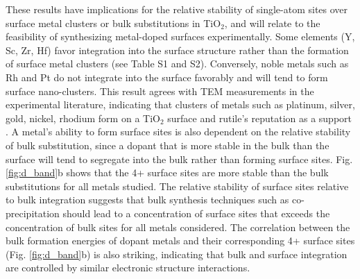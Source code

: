 
These results have implications for the relative stability of single-atom sites over surface metal clusters or bulk substitutions in TiO$_2$, and will relate to the feasibility of synthesizing metal-doped surfaces experimentally. Some elements (Y, Sc, Zr, Hf) favor integration into the surface structure rather than the formation of surface metal clusters (see Table S1 and S2). Conversely, noble metals such as Rh and Pt do not integrate into the surface favorably and will tend to form surface nano-clusters. This result agrees with TEM measurements in the experimental literature, indicating that clusters of metals such as platinum, silver, gold, nickel, rhodium form on a TiO$_2$ surface \cite{Iliev_2006, Dung_Dang_2010, Shinde_2013, Yu_2019} and rutile's reputation as a support \cite{Bagheri_2014}. A metal's ability to form surface sites is also dependent on the relative stability of bulk substitution, since a dopant that is more stable in the bulk than the surface will tend to segregate into the bulk rather than forming surface sites. Fig. \ref{fig:d_band}b shows that the 4+ surface sites are more stable than the bulk substitutions for all metals studied. The relative stability of surface sites relative to bulk integration suggests that bulk synthesis techniques such as co-precipitation should lead to a concentration of surface sites that exceeds the concentration of bulk sites for all metals considered.
The correlation between the bulk formation energies of dopant metals and their corresponding 4+ surface sites (Fig. \ref{fig:d_band}b) is also striking, indicating that bulk and surface integration are controlled by similar electronic structure interactions. %

